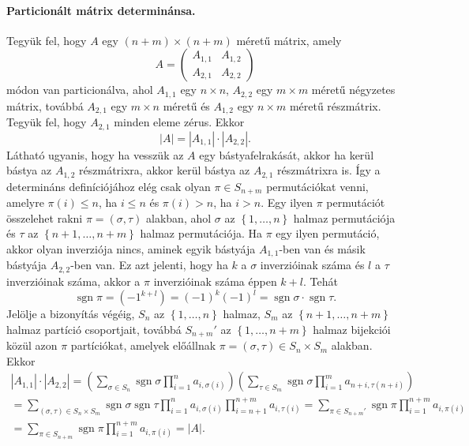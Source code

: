 \documentclass[9pt, a4paper, showtrims]{memoir}
\theoremstyle{plain}
\theoremstyle{remark}
\theoremstyle{definition}
\DeclareMathOperator{\sgn}{sgn}
\begin{document}
\paragraph{Particionált mátrix determinánsa.}
Tegyük fel, hogy $A$ egy $(n+m)\times(n+m)$ méretű mátrix,
amely
\[
    A
    =
    \begin{pmatrix}
        A_{1,1}&A_{1,2}\\
        A_{2,1}&A_{2,2}
    \end{pmatrix}
\]
módon van particionálva, ahol $A_{1,1}$ egy $n\times n$, $A_{2,2}$ egy $m\times m$ méretű négyzetes mátrix,
továbbá $A_{2,1}$ egy $m\times n$ méretű és $A_{1,2}$ egy $n\times m$ méretű részmátrix.
Tegyük fel, hogy $A_{2,1}$ minden eleme zérus.
Ekkor
\[
    |A|
    =
    |A_{1,1}|\cdot |A_{2,2}|.
\]
Látható ugyanis, hogy ha vesszük az $A$ egy bástyafelrakását, akkor ha kerül bástya az $A_{1,2}$ részmátrixra,
akkor kerül bástya az $A_{2,1}$ részmátrixra is.
Így a determináns definíciójához elég csak olyan $\pi\in S_{n+m}$ permutációkat venni,
amelyre $\pi(i)\leq n$, ha $i\leq n$ és $\pi(i)>n$, ha $i>n$.
Egy ilyen $\pi$ permutációt összelehet rakni $\pi=\left( \sigma,\tau \right)$ alakban,
ahol $\sigma$ az $\left\{ 1,\dots,n \right\}$ halmaz permutációja és $\tau$ az $\left\{ n+1,\dots,n+m \right\}$ halmaz permutációja.
Ha $\pi$ egy ilyen permutáció, 
akkor olyan inverziója nincs, 
aminek egyik bástyája $A_{1,1}$-ben van és másik bástyája $A_{2,2}$-ben van.
Ez azt jelenti, 
hogy ha $k$ a $\sigma$ inverzióinak száma és $l$ a $\tau$ inverzióinak száma, akkor
a $\pi$ inverzióinak száma éppen $k+l$.
Tehát
\[
    \sgn\pi=\left( -1^{k+l} \right)=\left( -1 \right)^k\left( -1 \right)^l=\sgn\sigma\cdot\sgn\tau.
\]
Jelölje a bizonyítás végéig, 
$S_n$ az $\left\{ 1,\dots,n \right\}$ halmaz, $S_m$ az $\left\{ n+1,\dots,n+m \right\}$ halmaz partíció csoportjait, továbbá
$S_{n+m}'$ az $\left\{ 1,\dots,n+m \right\}$ halmaz bijekciói közül azon $\pi$ partíciókat, 
amelyek előállnak $\pi=\left( \sigma,\tau \right)\in S_n\times S_m$ alakban.
Ekkor
\begin{multline*}
    |A_{1,1}|\cdot |A_{2,2}|=
    \left( 
        \sum_{\sigma\in S_n}\sgn\sigma\prod_{i=1}^na_{i,\sigma(i)}
    \right)
    \left( 
        \sum_{\tau\in S_m}\sgn\sigma\prod_{i=1}^ma_{n+i,\tau(n+i)}
    \right)
    \\
    =
    \sum_{(\sigma,\tau)\in S_n\times S_m}\sgn\sigma\sgn\tau\prod_{i=1}^na_{i,\sigma(i)}\prod_{i=n+1}^{n+m}a_{i,\tau(i)}
    =
    \sum_{\pi\in S_{n+m}'}\sgn\pi\prod_{i=1}^{n+m}a_{i,\pi(i)}
    \\
    =
    \sum_{\pi\in S_{n+m}}\sgn\pi\prod_{i=1}^{n+m}a_{i,\pi(i)}
    =
    |A|.
\end{multline*}
\end{document}

